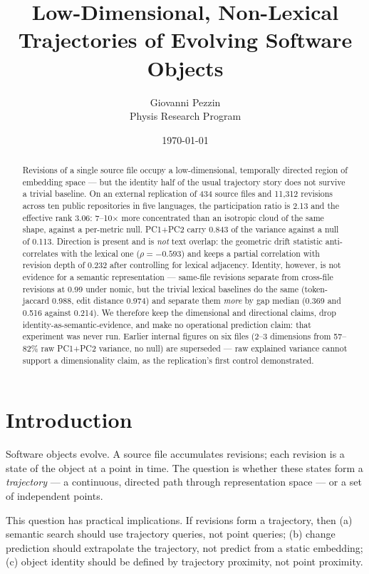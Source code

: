 \documentclass[11pt]{article}
\title{Low-Dimensional, Non-Lexical Trajectories of Evolving Software
Objects}
\author{Giovanni Pezzin \\ Physis Research Program}
\date{\today}
\begin{document}
\maketitle

\begin{abstract}
Revisions of a single source file occupy a low-dimensional, temporally
directed region of embedding space --- but the identity half of the usual
trajectory story does not survive a trivial baseline. On an external
replication of 434 source files and 11{,}312 revisions across ten public
repositories in five languages, the participation ratio is 2.13 and the
effective rank 3.06: 7--10$\times$ more concentrated than an isotropic cloud
of the same shape, against a per-metric null. PC1+PC2 carry 0.843 of the
variance against a null of 0.113. Direction is present and is \emph{not}
text overlap: the geometric drift statistic anti-correlates with the lexical
one ($\rho = -0.593$) and keeps a partial correlation with revision depth of
0.232 after controlling for lexical adjacency. Identity, however, is not
evidence for a semantic representation --- same-file revisions separate from
cross-file revisions at 0.99 under nomic, but the trivial lexical baselines
do the same (token-jaccard 0.988, edit distance 0.974) and separate them
\emph{more} by gap median (0.369 and 0.516 against 0.214). We therefore keep
the dimensional and directional claims, drop identity-as-semantic-evidence,
and make no operational prediction claim: that experiment was never run.
Earlier internal figures on six files (2--3 dimensions from 57--82\% raw
PC1+PC2 variance, no null) are superseded --- raw explained variance cannot
support a dimensionality claim, as the replication's first control
demonstrated.
\end{abstract}

\section{Introduction}

Software objects evolve. A source file accumulates revisions; each revision
is a state of the object at a point in time. The question is whether these
states form a \emph{trajectory} --- a continuous, directed path through
representation space --- or a set of independent points.

This question has practical implications. If revisions form a trajectory,
then (a) semantic search should use trajectory queries, not point queries;
(b) change prediction should extrapolate the trajectory, not predict from
a static embedding; (c) object identity should be defined by trajectory
proximity, not point proximity.
\end{document}
